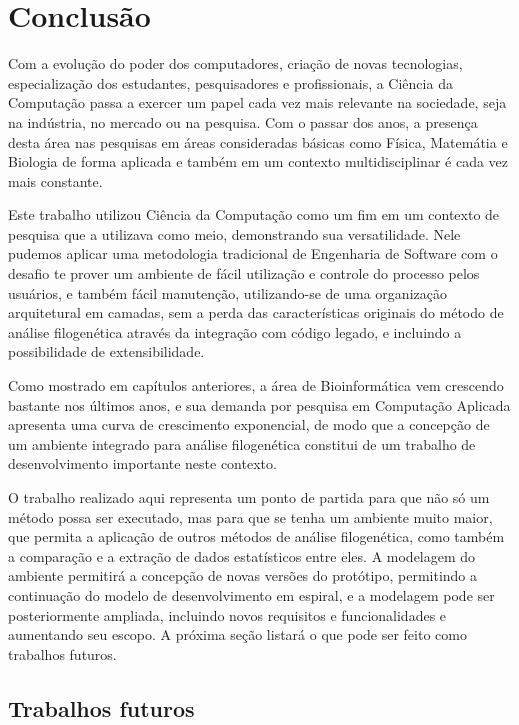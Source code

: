 \chapter{Conclusão} \label{cap:conclusao}

Com a evolução do poder dos computadores, criação de novas tecnologias, especialização dos estudantes, pesquisadores e profissionais, a Ciência da Computação
passa a exercer um papel cada vez mais relevante na sociedade, seja na indústria, no mercado ou na pesquisa. Com o passar dos anos, a presença desta área
nas pesquisas em áreas consideradas básicas como Física, Matemátia e Biologia de forma aplicada e também em um contexto multidisciplinar é cada vez mais
constante.

Este trabalho utilizou Ciência da Computação como um fim em um contexto de pesquisa que a utilizava como meio, demonstrando sua versatilidade. Nele pudemos
aplicar uma metodologia tradicional de Engenharia de Software com o desafio te prover um ambiente de fácil utilização e controle do processo pelos usuários,
e também fácil manutenção, utilizando-se de uma organização arquitetural em camadas, sem a perda das características originais do método de análise
filogenética através da integração com código legado, e incluindo a possibilidade de extensibilidade.

Como mostrado em capítulos anteriores, a área de Bioinformática vem crescendo bastante nos últimos anos, e sua demanda por pesquisa em Computação Aplicada
apresenta uma curva de crescimento exponencial, de modo que a concepção de um ambiente integrado para análise filogenética constitui de um trabalho de
desenvolvimento importante neste contexto.

O trabalho realizado aqui representa um ponto de partida para que não só um método possa ser executado, mas para que se tenha um ambiente muito maior, que
permita a aplicação de outros métodos de análise filogenética, como também a comparação e a extração de dados estatísticos entre eles. A modelagem do
ambiente permitirá a concepção de novas versões do protótipo, permitindo a continuação do modelo de desenvolvimento em espiral, e a modelagem pode
ser posteriormente ampliada, incluindo novos requisitos e funcionalidades e aumentando seu escopo. A próxima seção listará o que pode ser feito como trabalhos
futuros.

\section{Trabalhos futuros}

